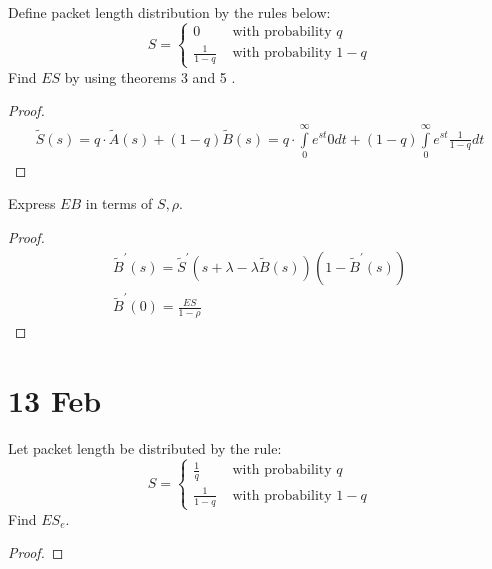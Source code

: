 \begin{prob}
Define packet length distribution by the rules below:
$$
S =
\begin{cases}
    0 & \text { with probability } q\\
    \frac{1}{1-q} & \text { with probability } 1-q
\end{cases}
$$
Find $E S$ by using theorems 3 and 5 .
\end{prob}

\begin{proof}
\begin{gather*}
    \widetilde{S}(s) = q \cdot \widetilde{A}(s) + (1 - q) \widetilde{B}(s)
    = q \cdot \int\limits_{0}^{\infty} e^{st} 0 dt + (1 - q) \int\limits_{0}^{\infty} e^{st} \frac{1}{1 - q} dt
\end{gather*}
\end{proof}
\vskip 0.6in



\begin{prob}
Express $EB$ in terms of $S, \rho$.
\end{prob}

\begin{proof}
\begin{gather*}
    \widetilde{B}^{\prime}(s)
    = \widetilde{S}^{\prime} (s + \lambda - \lambda \widetilde{B}(s))(1 - \widetilde{B}^{\prime}(s))\\
    \widetilde{B}^{\prime}(0)
    = \frac{ES}{1 - \rho}
\end{gather*}
\end{proof}
\vskip 0.6in



\section{13 Feb}

\begin{prob}
Let packet length be distributed by the rule:
$$
S =
\begin{cases}
    \frac{1}{q} & \text { with probability } q \\
    \frac{1}{1-q} & \text { with probability } 1-q
\end{cases}
$$
Find $E S_e$.
\end{prob}

\begin{proof}

\end{proof}
\vskip 0.6in



